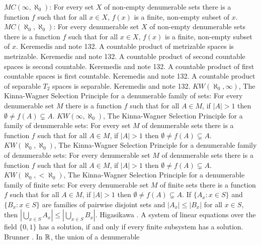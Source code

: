 \medskip
{} $MC(\infty,\aleph_0)$: For every set $X$ of
non-empty denumerable sets there is a function $f$ such that for all
$x\in X$, $f(x)$ is a finite, non-empty subset of $x$.
\medskip
{} $MC(\aleph_0,\aleph_0)$: For every denumerable
set $X$ of non-empty denumerable sets there is a function $f$ such that
for all $x\in X$, $f(x)$ is a finite, non-empty subset of $x$.
\ac{Keremedis} \cite{1996b} and note 132.
\medskip
{} A countable product of metrizable spaces
is metrizable. \ac{Keremedis} \cite{1996b} and note 132.
\medskip
{} A countable product of second countable
spaces is second countable. \ac{Keremedis} \cite{1996b} and note 132.
\medskip
{} A countable product of first countable spaces
is first countable. \ac{Keremedis} \cite{1996b} and note 132.
\medskip
{} A countable product of separable $T_2$ spaces
is separable. \ac{Keremedis} \cite{1996b} and note 132.
\medskip
{} $KW(\aleph_0,\infty)$, The Kinna-Wagner Selection
Principle for a denumerable family of sets: For every denumerable set
$M$ there is a function $f$ such that for all $A\in M$, if $|A| > 1$
then $\emptyset\neq f(A)\subsetneq A$.
\medskip
{} $KW(\infty,\aleph_0)$, The Kinna-Wagner Selection
Principle for a family of denumerable sets: For every set $M$ of
denumerable sets there is a function $f$ such that for all $A\in M$,
if $|A| > 1$  then $\emptyset\neq f(A)\subsetneq A$.
\medskip
{} $KW(\aleph_0,\aleph_0)$, The Kinna-Wagner
Selection Principle for a denumerable family of denumerable sets: For
every denumerable set $M$ of denumerable sets there is a function $f$ such
that for all $A\in M$, if $|A| > 1$ then $\emptyset\neq f(A)\subsetneq A$.
\medskip
{} $KW(\aleph_0,<\aleph_0)$, The Kinna-Wagner
Selection Principle for a denumerable family of finite sets: For every
denumerable set $M$ of finite sets there is a function $f$ such that for
all $A\in M$, if $|A| > 1$ then $\emptyset\neq f(A)\subsetneq A$.
\medskip
{} If $\{A_{x}: x\in S\}$ and $\{B_{x}:
x\in S\}$ are families  of pairwise disjoint sets and $ |A_{x}|
\le |B_{x}|$ for all $x\in S$, then $|\bigcup_{x\in S}A_{x}|
\le |\bigcup_{x\in S} B_{x}|$. \ac{Higasikawa} \cite{1995}.
\medskip
{} A system of linear equations over the field
$\{0,1\}$ has a solution, if and only if every finite subsystem has
a solution. \ac{Brunner} \cite{1999}.
\medskip
{} In $\Bbb R$, the union of a denumerable
